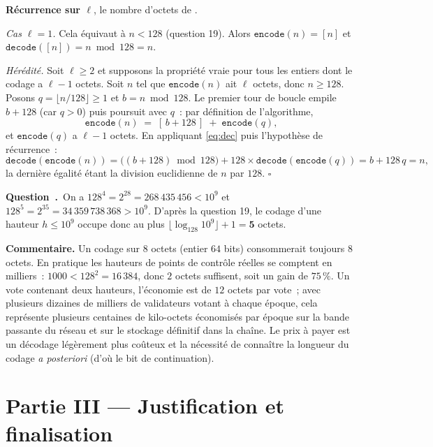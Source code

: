 \documentclass[11pt,a4paper]{article}
\renewcommand{\Q}{\medskip\par\stepcounter{qcnt}\noindent\textbf{\color{cnc}Question~\theqcnt.}~}
\begin{document}
\textbf{Récurrence sur $\ell$}, le nombre d'octets de .

\emph{Cas $\ell=1$.} Cela équivaut à $n<128$ (question 19). Alors $\texttt{encode}(n)=[n]$ et
$\texttt{decode}([n]) = n \bmod 128 = n$.

\emph{Hérédité.} Soit $\ell\ge 2$ et supposons la propriété vraie pour tous les entiers dont
le codage a $\ell-1$ octets. Soit $n$ tel que $\texttt{encode}(n)$ ait $\ell$ octets, donc
$n\ge 128$. Posons $q=\lfloor n/128\rfloor\ge 1$ et $b=n\bmod 128$. Le premier tour de boucle
empile $b+128$ (car $q>0$) puis poursuit avec $q$~: par définition de l'algorithme,
\[ \texttt{encode}(n) \;=\; [\,b+128\,] \;+\; \texttt{encode}(q), \]
et $\texttt{encode}(q)$ a $\ell-1$ octets. En appliquant \eqref{eq:dec} puis l'hypothèse de
récurrence~:
\[ \texttt{decode}(\texttt{encode}(n)) = \big((b+128)\bmod 128\big) + 128\times
\texttt{decode}(\texttt{encode}(q)) = b + 128\,q = n, \]
la dernière égalité étant la division euclidienne de $n$ par $128$. \hfill$\square$

\Q On a $128^4 = 2^{28} = 268\,435\,456 < 10^9$ et $128^5 = 2^{35} = 34\,359\,738\,368
> 10^9$. D'après la question 19, le codage d'une hauteur $h\le 10^9$ occupe donc au plus
$\lfloor\log_{128}10^9\rfloor+1 = \mathbf{5}$ octets.

\textbf{Commentaire.} Un codage sur $8$ octets (entier $64$ bits) consommerait toujours $8$
octets. En pratique les hauteurs de points de contrôle réelles se comptent en milliers~:
$1000<128^2=16\,384$, donc $2$ octets suffisent, soit un gain de $75\,\%$. Un vote contenant
deux hauteurs, l'économie est de $12$ octets par vote~; avec plusieurs dizaines de milliers
de validateurs votant à chaque époque, cela représente plusieurs centaines de kilo-octets
économisés par époque sur la bande passante du réseau et sur le stockage définitif dans la
chaîne. Le prix à payer est un décodage légèrement plus coûteux et la nécessité de connaître
la longueur du codage \emph{a posteriori} (d'où le bit de continuation).

\section*{Partie III --- Justification et finalisation}
\end{document}
